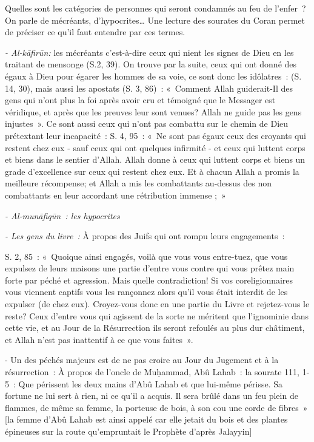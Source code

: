 
Quelles sont les catégories de personnes qui seront condamnés au feu de
l'enfer~? On parle de mécréants, d'hypocrites\ldots{} Une lecture des
sourates du Coran permet de préciser ce qu'il faut entendre par ces
termes.

\emph{- Al-kāfirūn:} les mécréants c'est-à-dire ceux qui nient les
signes de Dieu en les traitant de mensonge (S.2, 39). On trouve par la
suite, ceux qui ont donné des égaux à Dieu pour égarer les hommes de sa
voie, ce sont donc les idôlatres~: (S. 14, 30), mais aussi les apostats
(S. 3, 86)~: «~Comment Allah guiderait-Il des gens qui n'ont plus la foi
après avoir cru et témoigné que le Messager est véridique, et après que
les preuves leur sont venues? Allah ne guide pas les gens injustes~». Ce
sont aussi ceux qui n'ont pas combattu sur le chemin de Dieu prétextant
leur incapacité~: S. 4, 95~: «~Ne sont pas égaux ceux des croyants qui
restent chez eux - sauf ceux qui ont quelques infirmité - et ceux qui
luttent corps et biens dans le sentier d'Allah. Allah donne à ceux qui
luttent corps et biens un grade d'excellence sur ceux qui restent chez
eux. Et à chacun Allah a promis la meilleure récompense; et Allah a mis
les combattants au-dessus des non combattants en leur accordant une
rétribution immense ;~»

\emph{- Al-munāfiqūn~: les hypocrites}

\emph{- Les gens du livre~:} À propos des Juifs qui ont rompu leurs
engagements~:

S. 2, 85~: «~Quoique ainsi engagés, voilà que vous vous entre-tuez, que
vous expulsez de leurs maisons une partie d'entre vous contre qui vous
prêtez main forte par péché et agression. Mais quelle contradiction! Si
vos coreligionnaires vous viennent captifs vous les rançonnez alors
qu'il vous était interdit de les expulser (de chez eux). Croyez-vous
donc en une partie du Livre et rejetez-vous le reste? Ceux d'entre vous
qui agissent de la sorte ne méritent que l'ignominie dans cette vie, et
au Jour de la Résurrection ils seront refoulés au plus dur châtiment, et
Allah n'est pas inattentif à ce que vous faites~».

- Un des péchés majeurs est de ne pas croire au Jour du Jugement et à la
résurrection~: À propos de l'oncle de Muḥammad, Abû Lahab~: la sourate
111, 1-5~: Que périssent les deux mains d'Abû Lahab et que lui-même
périsse. Sa fortune ne lui sert à rien, ni ce qu'il a acquis. Il sera
brûlé dans un feu plein de flammes, de même sa femme, la porteuse de
bois, à son cou une corde de fibres~» {[}la femme d'Abû Lahab est ainsi
appelé car elle jetait du bois et des plantes épineuses sur la route
qu'empruntait le Prophète d'après Jalayyin{]}

